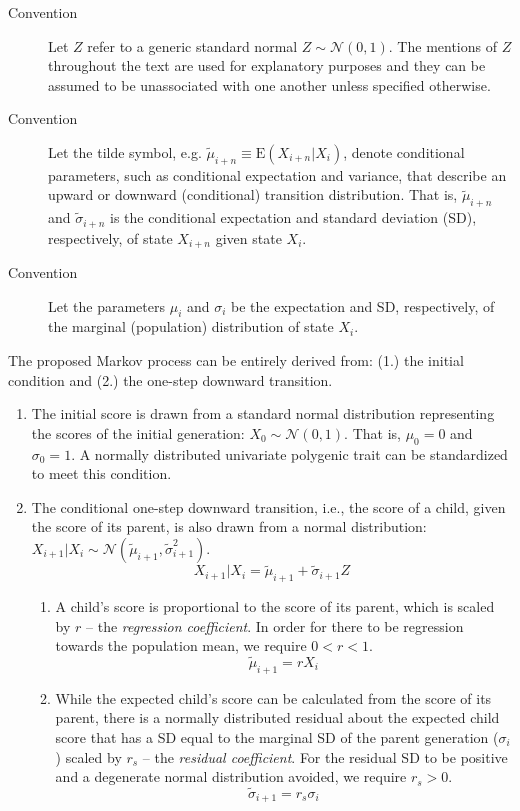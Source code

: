\documentclass[a4paper,11pt]{article} %
\begin{document}
\begin{description}
\item [Convention] Let $Z$ refer to a generic standard normal $Z \sim \mathcal{N}(0, 1)$. The mentions of $Z$ throughout the text are used for explanatory purposes and they can be assumed to be unassociated with one another unless specified otherwise.
\item [Convention] Let the tilde symbol, e.g. $\tilde{\mu}_{i+n} \equiv \mathrm{E}(X_{i+n}|X_i)$, denote conditional parameters, such as conditional expectation and variance, that describe an upward or downward (conditional) transition distribution. That is, $\tilde{\mu}_{i+n}$ and $\tilde{\sigma}_{i+n}$ is the conditional expectation and standard deviation (SD), respectively, of state $X_{i+n}$ given state $X_i$. 
\item [Convention] Let the parameters $\mu_i$ and $\sigma_i$ be the expectation and SD, respectively, of the marginal (population) distribution of state $X_i$. 
\end{description}

The proposed Markov process can be entirely derived from: (1.) the initial condition and (2.) the one-step downward transition. 

\begin{enumerate}
\item The initial score is drawn from a standard normal distribution representing the scores of the initial generation: $X_0 \sim \mathcal{N}(0, 1)$. That is, $\mu_0 = 0$ and $\sigma_0 = 1$. A normally distributed univariate polygenic trait can be standardized to meet this condition. 

\item The conditional one-step downward transition, i.e., the score of a child, given the score of its parent, is also drawn from a normal distribution: $X_{i+1}|X_i \sim \mathcal{N}(\tilde{\mu}_{i+1}, \tilde{\sigma}_{i+1}^2)$.
$$X_{i+1}|X_i = \tilde{\mu}_{i+1} + \tilde{\sigma}_{i+1} Z$$ 

\begin{enumerate}
\item A child's score is proportional to the score of its parent, which is scaled by $r$ -- the \emph{regression coefficient}. In order for there to be regression towards the population mean, we require $0 < r < 1$. 
$$\tilde{\mu}_{i+1} = rX_i$$

\item While the expected child's score can be calculated from the score of its parent, there is a normally distributed residual about the expected child score that has a SD equal to the marginal SD of the parent generation ($\sigma_i$) scaled by $r_s$ -- the \emph{residual coefficient}. For the residual SD to be positive and a degenerate normal distribution avoided, we require $r_s > 0$.
$$\tilde{\sigma}_{i+1} = r_s \sigma_i$$
\end{enumerate}
\end{enumerate}
\end{document}
